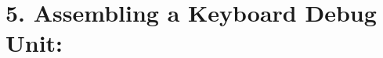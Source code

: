 \documentclass{article}
\begin{document}
\section{5. Assembling a Keyboard Debug Unit:}
% 
% 
% 


\newpage
\end{document}
